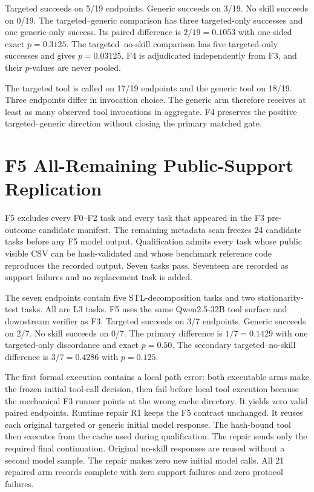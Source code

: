 Targeted succeeds on 5/19 endpoints. Generic succeeds on 3/19. No skill succeeds on 0/19. The targeted--generic comparison has three targeted-only successes and one generic-only success. Its paired difference is $2/19=0.1053$ with one-sided exact $p=0.3125$. The targeted--no-skill comparison has five targeted-only successes and gives $p=0.03125$. F4 is adjudicated independently from F3, and their $p$-values are never pooled.

The targeted tool is called on 17/19 endpoints and the generic tool on 18/19. Three endpoints differ in invocation choice. The generic arm therefore receives at least as many observed tool invocations in aggregate. F4 preserves the positive targeted--generic direction without closing the primary matched gate.

\section{F5 All-Remaining Public-Support Replication}
\label{app:f5}
F5 excludes every F0--F2 task and every task that appeared in the F3 pre-outcome candidate manifest. The remaining metadata scan freezes 24 candidate tasks before any F5 model output. Qualification admits every task whose public visible CSV can be hash-validated and whose benchmark reference code reproduces the recorded output. Seven tasks pass. Seventeen are recorded as support failures and no replacement task is added.

The seven endpoints contain five STL-decomposition tasks and two stationarity-test tasks. All are L3 tasks. F5 uses the same Qwen2.5-32B tool surface and downstream verifier as F3. Targeted succeeds on 3/7 endpoints. Generic succeeds on 2/7. No skill succeeds on 0/7. The primary difference is $1/7=0.1429$ with one targeted-only discordance and exact $p=0.50$. The secondary targeted--no-skill difference is $3/7=0.4286$ with $p=0.125$.

The first formal execution contains a local path error: both executable arms make the frozen initial tool-call decision, then fail before local tool execution because the mechanical F3 runner points at the wrong cache directory. It yields zero valid paired endpoints. Runtime repair R1 keeps the F5 contract unchanged. It reuses each original targeted or generic initial model response. The hash-bound tool then executes from the cache used during qualification. The repair sends only the required final continuation. Original no-skill responses are reused without a second model sample. The repair makes zero new initial model calls. All 21 repaired arm records complete with zero support failures and zero protocol failures.

